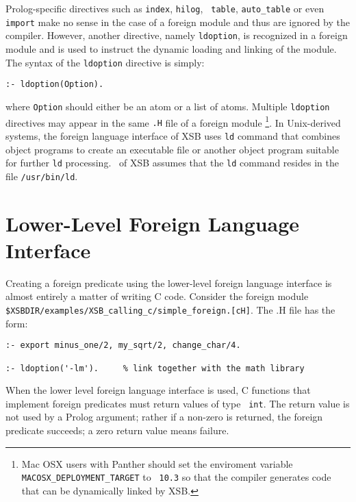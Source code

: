 Prolog-specific directives such as {\tt index}, {\tt hilog}, {\tt
  table}, {\tt auto\_table} or even {\tt import} make no sense in the
case of a foreign module and thus are ignored by the compiler.
However, another directive, namely {\tt ldoption}, is recognized in a
foreign module and is used to instruct the dynamic loading and linking
of the module.  The syntax of the {\tt ldoption} directive is simply:
\begin{center}
{\tt  :- ldoption(Option).    }
\end{center}
where {\tt Option} should either be an atom or a list of atoms.
Multiple {\tt ldoption} directives may appear in the same {\tt .H}
file of a foreign module \footnote{Mac OSX users with Panther should
  set the enviroment variable {\tt MACOSX\_DEPLOYMENT\_TARGET} to {\tt
    10.3} so that the compiler generates code that can be dynamically
  linked by XSB.}.
In Unix-derived systems, the foreign language interface of XSB uses
{\tt ld} command that combines object programs to create an executable
file or another object program suitable for further {\tt ld}
processing. \version\ of XSB assumes that the {\tt ld} command resides
in the file {\tt /usr/bin/ld}.

\section{Lower-Level Foreign Language Interface}

Creating a foreign predicate using the lower-level foreign language
interface is almost entirely a matter of writing C code.  Consider the
foreign module {\tt
  \$XSBDIR/examples/XSB\_calling\_c/simple\_foreign.[cH]}.  The .H file
has the form: 

\begin{verbatim}
:- export minus_one/2, my_sqrt/2, change_char/4.

:- ldoption('-lm').     % link together with the math library
\end{verbatim}

When the lower level foreign language interface is used, C functions
that implement foreign predicates must return values of type {\tt
  int}.  The return value is not used by a Prolog argument; rather if
a non-zero is returned, the foreign predicate succeeds; a zero return
value means failure.

